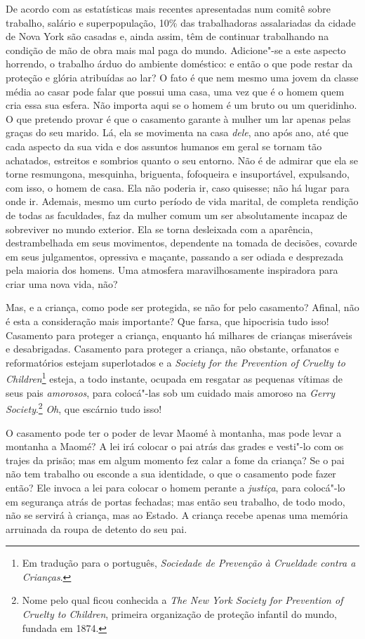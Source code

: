 De acordo com as estatísticas mais recentes apresentadas num comitê
sobre trabalho, salário e superpopulação, 10\% das trabalhadoras
assalariadas da cidade de Nova York são casadas e, ainda assim, têm de
continuar trabalhando na condição de mão de obra mais mal paga do mundo.
Adicione"-se a este aspecto horrendo, o trabalho árduo do ambiente
doméstico: e então o que pode restar da proteção e glória atribuídas ao
lar? O fato é que nem mesmo uma jovem da classe média ao casar pode
falar que possui uma casa, uma vez que é o homem quem cria essa sua
esfera. Não importa aqui se o homem é um bruto ou um queridinho. O que
pretendo provar é que o casamento garante à mulher um lar apenas pelas
graças do seu marido. Lá, ela se movimenta na casa \textit{dele}, ano após
ano, até que cada aspecto da sua vida e dos assuntos humanos em geral se
tornam tão achatados, estreitos e sombrios quanto o seu entorno. Não é de admirar que ela se torne resmungona, mesquinha,
briguenta, fofoqueira e insuportável, expulsando, com isso, o homem de
casa. Ela não poderia ir, caso quisesse; não há lugar para onde ir.
Ademais, mesmo um curto período de vida marital, de completa rendição de
todas as faculdades, faz da mulher comum um ser absolutamente incapaz de
sobreviver no mundo exterior. Ela se torna desleixada com a aparência,
destrambelhada em seus movimentos, dependente na tomada de decisões,
covarde em seus julgamentos, opressiva e maçante, passando a ser odiada
e desprezada pela maioria dos homens. Uma atmosfera maravilhosamente
inspiradora para criar uma nova vida, não?

Mas, e a criança, como pode ser protegida, se não for pelo casamento?
Afinal, não é esta a consideração mais importante? Que farsa, que
hipocrisia tudo isso! Casamento para proteger a criança, enquanto há
milhares de crianças miseráveis e desabrigadas. Casamento para proteger
a criança, não obstante, orfanatos e reformatórios estejam superlotados
e a \textit{Society for the Prevention of Cruelty to Children}\footnote{Em tradução para o português, \textit{Sociedade de Prevenção à Crueldade contra a Crianças}.} esteja, a todo instante,
ocupada em resgatar as pequenas vítimas de seus pais \textit{amorosos}, para
colocá"-las sob um cuidado mais amoroso na \textit{Gerry
Society}.\footnote{Nome pelo qual ficou conhecida a \textit{The New York Society for Prevention of Cruelty to Children}, primeira organização de proteção infantil do mundo, fundada em 1874.} \textit{Oh}, que escárnio tudo isso!

O casamento pode ter o poder de levar Maomé à montanha, mas pode levar a
montanha a Maomé? A lei irá colocar o pai atrás das grades e
vesti"-lo com os trajes da prisão; mas em algum momento fez calar a fome
da criança? Se o pai não tem trabalho ou esconde a sua identidade, o que
o casamento pode fazer então? Ele invoca a lei para colocar o homem perante a
\textit{justiça}, para colocá"-lo em segurança atrás de portas fechadas; mas
então seu trabalho, de todo modo, não se servirá à criança, mas ao
Estado. A criança recebe apenas uma memória arruinada da roupa de
detento do seu pai.

